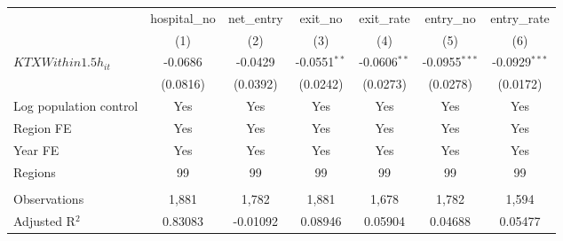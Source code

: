 \begingroup
\centering
\begin{tabular}{lcccccc}
   \toprule
                          & hospital\_no  & net\_entry  & exit\_no       & exit\_rate     & entry\_no       & entry\_rate \\    
                          & (1)           & (2)         & (3)            & (4)            & (5)             & (6)\\  
   \midrule 
   $KTXWithin1.5h_{it}$   & -0.0686       & -0.0429     & -0.0551$^{**}$ & -0.0606$^{**}$ & -0.0955$^{***}$ & -0.0929$^{***}$\\   
                          & (0.0816)      & (0.0392)    & (0.0242)       & (0.0273)       & (0.0278)        & (0.0172)\\   
   Log population control & Yes           & Yes         & Yes            & Yes            & Yes             & Yes\\  
   Region FE              & Yes           & Yes         & Yes            & Yes            & Yes             & Yes\\  
   Year FE                & Yes           & Yes         & Yes            & Yes            & Yes             & Yes\\  
   Regions                & 99            & 99          & 99             & 99             & 99              & 99\\  
    \\
   Observations           & 1,881         & 1,782       & 1,881          & 1,678          & 1,782           & 1,594\\  
   Adjusted R$^2$         & 0.83083       & -0.01092    & 0.08946        & 0.05904        & 0.04688         & 0.05477\\  
   \bottomrule
\end{tabular}
\par\endgroup
